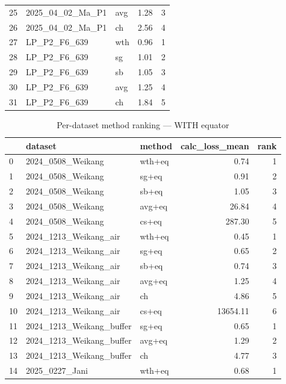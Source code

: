 \documentclass{article}
\begin{document}
\begin{table}[ht]
\begin{tabular}{lllrr}
25 & 2025\_04\_02\_Ma\_P1         & avg & 1.28 & 3 \\
26 & 2025\_04\_02\_Ma\_P1         & ch  & 2.56 & 4 \\
27 & LP\_P2\_F6\_639              & wth & 0.96 & 1 \\
28 & LP\_P2\_F6\_639              & sg  & 1.01 & 2 \\
29 & LP\_P2\_F6\_639              & sb  & 1.05 & 3 \\
30 & LP\_P2\_F6\_639              & avg & 1.25 & 4 \\
31 & LP\_P2\_F6\_639              & ch  & 1.84 & 5 \\
\bottomrule
\end{tabular}
\end{table}

\begin{table}[ht]
\centering
\caption{Per-dataset method ranking --- WITH equator}
\begin{tabular}{lllrr}
\toprule
 & dataset & method & calc\_loss\_mean & rank \\
\midrule
0  & 2024\_0508\_Weikang        & wth+eq & 0.74     & 1 \\
1  & 2024\_0508\_Weikang        & sg+eq  & 0.91     & 2 \\
2  & 2024\_0508\_Weikang        & sb+eq  & 1.05     & 3 \\
3  & 2024\_0508\_Weikang        & avg+eq & 26.84    & 4 \\
4  & 2024\_0508\_Weikang        & cs+eq  & 287.30   & 5 \\
5  & 2024\_1213\_Weikang\_air    & wth+eq & 0.45     & 1 \\
6  & 2024\_1213\_Weikang\_air    & sg+eq  & 0.65     & 2 \\
7  & 2024\_1213\_Weikang\_air    & sb+eq  & 0.74     & 3 \\
8  & 2024\_1213\_Weikang\_air    & avg+eq & 1.25     & 4 \\
9  & 2024\_1213\_Weikang\_air    & ch     & 4.86     & 5 \\
10 & 2024\_1213\_Weikang\_air    & cs+eq  & 13654.11 & 6 \\
11 & 2024\_1213\_Weikang\_buffer & sg+eq  & 0.65     & 1 \\
12 & 2024\_1213\_Weikang\_buffer & avg+eq & 1.29     & 2 \\
13 & 2024\_1213\_Weikang\_buffer & ch     & 4.77     & 3 \\
14 & 2025\_0227\_Jani           & wth+eq & 0.68     & 1 \\

\end{tabular}
\end{table}
\end{document}
